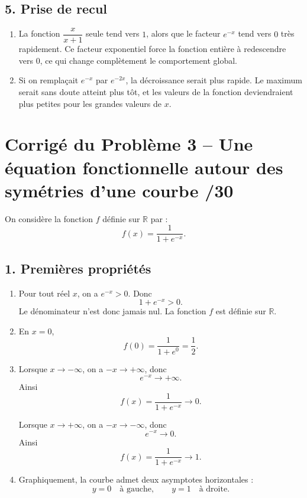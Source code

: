 \documentclass[11pt,a4paper]{article}
\begin{document}
\subsection*{5. Prise de recul}

\begin{enumerate}
    \item La fonction \(\dfrac{x}{x+1}\) seule tend vers \(1\), alors que le facteur \(e^{-x}\) tend vers \(0\) très rapidement. Ce facteur exponentiel force la fonction entière à redescendre vers \(0\), ce qui change complètement le comportement global.

    \item Si on remplaçait \(e^{-x}\) par \(e^{-2x}\), la décroissance serait plus rapide. Le maximum serait sans doute atteint plus tôt, et les valeurs de la fonction deviendraient plus petites pour les grandes valeurs de \(x\).
\end{enumerate}

\newpage

\section*{Corrigé du Problème 3 -- Une équation fonctionnelle autour des symétries d'une courbe \hfill /30}

On considère la fonction \(f\) définie sur \(\mathbb{R}\) par :
\[
f(x)=\frac{1}{1+e^{-x}}.
\]

\subsection*{1. Premières propriétés}

\begin{enumerate}
    \item Pour tout réel \(x\), on a \(e^{-x}>0\). Donc
    \[
    1+e^{-x}>0.
    \]
    Le dénominateur n'est donc jamais nul. La fonction \(f\) est définie sur \(\mathbb{R}\).

    \item En \(x=0\),
    \[
    f(0)=\frac{1}{1+e^0}=\frac{1}{2}.
    \]

    \item Lorsque \(x\to -\infty\), on a \(-x\to +\infty\), donc
    \[
    e^{-x}\to +\infty.
    \]
    Ainsi
    \[
    f(x)=\frac{1}{1+e^{-x}}\to 0.
    \]

    Lorsque \(x\to +\infty\), on a \(-x\to -\infty\), donc
    \[
    e^{-x}\to 0.
    \]
    Ainsi
    \[
    f(x)=\frac{1}{1+e^{-x}}\to 1.
    \]

    \item Graphiquement, la courbe admet deux asymptotes horizontales :
    \[
    y=0 \quad \text{à gauche}, \qquad y=1 \quad \text{à droite}.
    \]
\end{enumerate}
\end{document}
